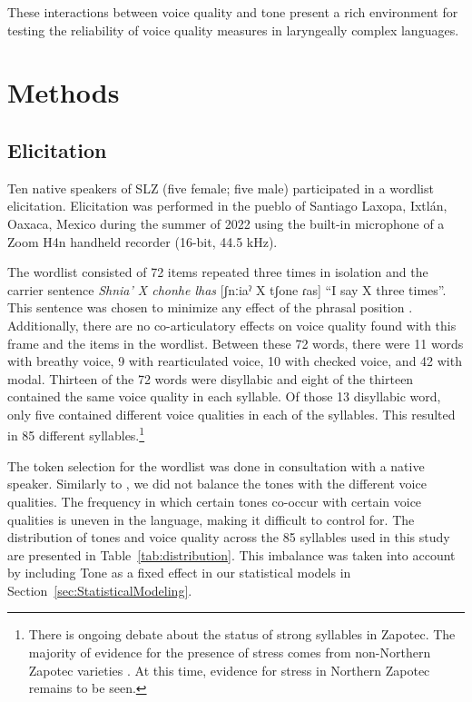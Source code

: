 These interactions between voice quality and tone present a rich environment for testing the reliability of voice quality measures in laryngeally complex languages.

\section{Methods} \label{sec:Methods}
\subsection{Elicitation} \label{sec:Elicitation}

Ten native speakers of SLZ (five female; five male) participated in a wordlist elicitation. Elicitation was performed in the pueblo of Santiago Laxopa, Ixtlán, Oaxaca, Mexico during the summer of 2022 using the built-in microphone of a Zoom H4n handheld recorder (16-bit, 44.5 kHz). 

The wordlist consisted of 72 items repeated three times in isolation and the carrier sentence \textit{Shnia' X chonhe lhas} [ʃnːiaˀ X tʃone ɾas] ``I say X three times''. This sentence was chosen to minimize any effect of the phrasal position \citep[see][for a study about phrasal effects on voice quality in Zapotec]{crowhurstInfluenceVowelLaryngealisation2016}. Additionally, there are no co-articulatory effects on voice quality found with this frame and the items in the wordlist.  Between these 72 words, there were 11 words with breathy voice, 9 with rearticulated voice, 10 with checked voice, and 42 with modal. Thirteen of the 72 words were disyllabic and eight of the thirteen contained the same voice quality in each syllable. Of those 13 disyllabic word, only five contained different voice qualities in each of the syllables. This resulted in 85 different syllables.\footnote{There is ongoing debate about the status of strong syllables in Zapotec. The majority of evidence for the presence of stress comes from non-Northern Zapotec varieties \citep[e.g.,][]{chavez-peonPhoneticCuesStress2008,mockPitchAccentStress1988}. At this time, evidence for stress in Northern Zapotec remains to be seen.} 

The token selection for the wordlist was done in consultation with a native speaker. Similarly to \citet{barzilaiContextdependentPhoneticEnhancement2021}, we did not balance the tones with the different voice qualities. The frequency in which certain tones co-occur with certain voice qualities is uneven in the language, making it difficult to control for. The distribution of tones and voice quality across the 85 syllables used in this study are presented in Table~\ref{tab:distribution}. This imbalance was taken into account by including Tone as a fixed effect in our statistical models in Section~\ref{sec:StatisticalModeling}.

